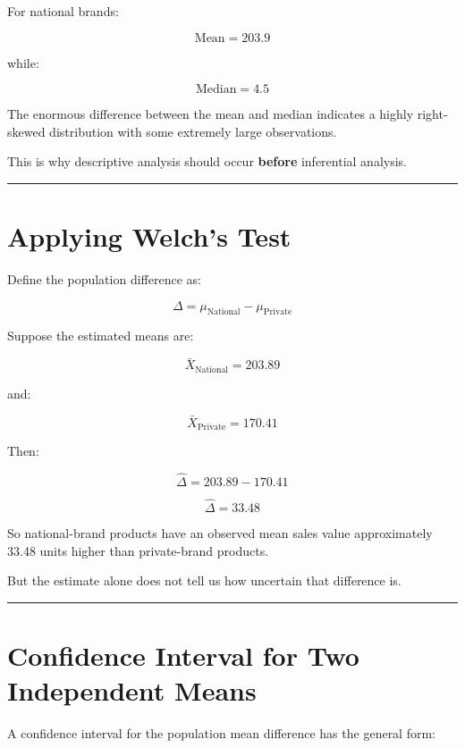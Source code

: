 \documentclass[
  letterpaper,
  DIV=11,
  numbers=noendperiod]{scrreprt}
\begin{document}
For national brands:

\[
\text{Mean}=203.9
\]

while:

\[
\text{Median}=4.5
\]

The enormous difference between the mean and median indicates a highly
right-skewed distribution with some extremely large observations.

This is why descriptive analysis should occur \textbf{before}
inferential analysis.

\begin{center}\rule{0.5\linewidth}{0.5pt}\end{center}


\chapter{Applying Welch's Test}\label{applying-welchs-test}

Define the population difference as:

\[
\Delta
=
\mu_{\text{National}}
-
\mu_{\text{Private}}
\]

Suppose the estimated means are:

\[
\bar{X}_{\text{National}}
=
203.89
\]

and:

\[
\bar{X}_{\text{Private}}
=
170.41
\]

Then:

\[
\hat{\Delta}
=
203.89-170.41
\]

\[
\boxed{
\hat{\Delta}=33.48
}
\]

So national-brand products have an observed mean sales value
approximately 33.48 units higher than private-brand products.

But the estimate alone does not tell us how uncertain that difference
is.

\begin{center}\rule{0.5\linewidth}{0.5pt}\end{center}


\chapter{Confidence Interval for Two Independent
Means}\label{confidence-interval-for-two-independent-means}

A confidence interval for the population mean difference has the general
form:
\end{document}
